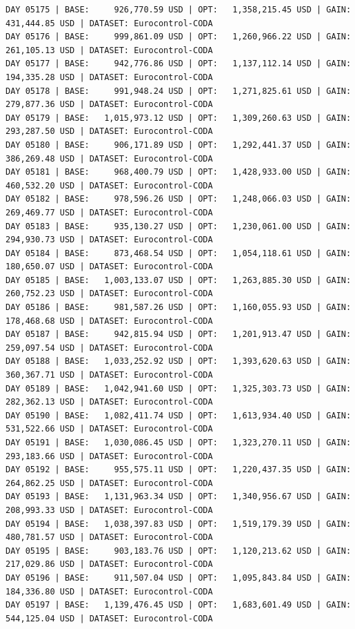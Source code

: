 \documentclass[11pt,a4paper]{article}
\begin{document}
\begin{verbatim}
DAY 05175 | BASE:     926,770.59 USD | OPT:   1,358,215.45 USD | GAIN: 431,444.85 USD | DATASET: Eurocontrol-CODA
DAY 05176 | BASE:     999,861.09 USD | OPT:   1,260,966.22 USD | GAIN: 261,105.13 USD | DATASET: Eurocontrol-CODA
DAY 05177 | BASE:     942,776.86 USD | OPT:   1,137,112.14 USD | GAIN: 194,335.28 USD | DATASET: Eurocontrol-CODA
DAY 05178 | BASE:     991,948.24 USD | OPT:   1,271,825.61 USD | GAIN: 279,877.36 USD | DATASET: Eurocontrol-CODA
DAY 05179 | BASE:   1,015,973.12 USD | OPT:   1,309,260.63 USD | GAIN: 293,287.50 USD | DATASET: Eurocontrol-CODA
DAY 05180 | BASE:     906,171.89 USD | OPT:   1,292,441.37 USD | GAIN: 386,269.48 USD | DATASET: Eurocontrol-CODA
DAY 05181 | BASE:     968,400.79 USD | OPT:   1,428,933.00 USD | GAIN: 460,532.20 USD | DATASET: Eurocontrol-CODA
DAY 05182 | BASE:     978,596.26 USD | OPT:   1,248,066.03 USD | GAIN: 269,469.77 USD | DATASET: Eurocontrol-CODA
DAY 05183 | BASE:     935,130.27 USD | OPT:   1,230,061.00 USD | GAIN: 294,930.73 USD | DATASET: Eurocontrol-CODA
DAY 05184 | BASE:     873,468.54 USD | OPT:   1,054,118.61 USD | GAIN: 180,650.07 USD | DATASET: Eurocontrol-CODA
DAY 05185 | BASE:   1,003,133.07 USD | OPT:   1,263,885.30 USD | GAIN: 260,752.23 USD | DATASET: Eurocontrol-CODA
DAY 05186 | BASE:     981,587.26 USD | OPT:   1,160,055.93 USD | GAIN: 178,468.68 USD | DATASET: Eurocontrol-CODA
DAY 05187 | BASE:     942,815.94 USD | OPT:   1,201,913.47 USD | GAIN: 259,097.54 USD | DATASET: Eurocontrol-CODA
DAY 05188 | BASE:   1,033,252.92 USD | OPT:   1,393,620.63 USD | GAIN: 360,367.71 USD | DATASET: Eurocontrol-CODA
DAY 05189 | BASE:   1,042,941.60 USD | OPT:   1,325,303.73 USD | GAIN: 282,362.13 USD | DATASET: Eurocontrol-CODA
DAY 05190 | BASE:   1,082,411.74 USD | OPT:   1,613,934.40 USD | GAIN: 531,522.66 USD | DATASET: Eurocontrol-CODA
DAY 05191 | BASE:   1,030,086.45 USD | OPT:   1,323,270.11 USD | GAIN: 293,183.66 USD | DATASET: Eurocontrol-CODA
DAY 05192 | BASE:     955,575.11 USD | OPT:   1,220,437.35 USD | GAIN: 264,862.25 USD | DATASET: Eurocontrol-CODA
DAY 05193 | BASE:   1,131,963.34 USD | OPT:   1,340,956.67 USD | GAIN: 208,993.33 USD | DATASET: Eurocontrol-CODA
DAY 05194 | BASE:   1,038,397.83 USD | OPT:   1,519,179.39 USD | GAIN: 480,781.57 USD | DATASET: Eurocontrol-CODA
DAY 05195 | BASE:     903,183.76 USD | OPT:   1,120,213.62 USD | GAIN: 217,029.86 USD | DATASET: Eurocontrol-CODA
DAY 05196 | BASE:     911,507.04 USD | OPT:   1,095,843.84 USD | GAIN: 184,336.80 USD | DATASET: Eurocontrol-CODA
DAY 05197 | BASE:   1,139,476.45 USD | OPT:   1,683,601.49 USD | GAIN: 544,125.04 USD | DATASET: Eurocontrol-CODA

\end{verbatim}
\end{document}
